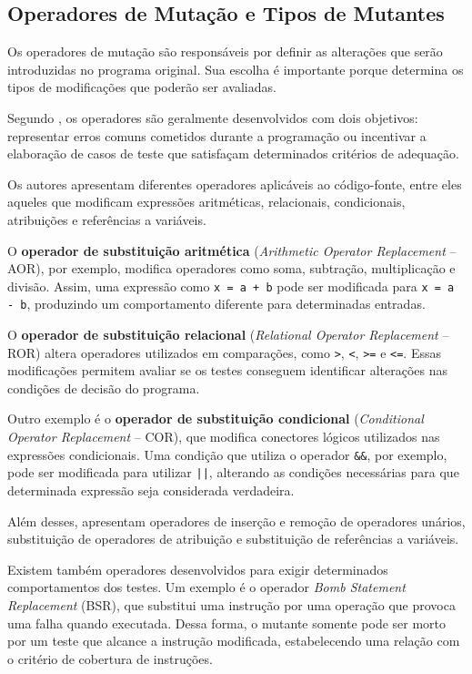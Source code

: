 \subsection{Operadores de Mutação e Tipos de Mutantes}

Os operadores de mutação são responsáveis por definir as alterações que serão introduzidas no programa original. Sua escolha é importante porque determina os tipos de modificações que poderão ser avaliadas.

Segundo , os operadores são geralmente desenvolvidos com dois objetivos: representar erros comuns cometidos durante a programação ou incentivar a elaboração de casos de teste que satisfaçam determinados critérios de adequação.

Os autores apresentam diferentes operadores aplicáveis ao código-fonte, entre eles aqueles que modificam expressões aritméticas, relacionais, condicionais, atribuições e referências a variáveis.

O \textbf{operador de substituição aritmética} (\textit{Arithmetic Operator Replacement} -- AOR), por exemplo, modifica operadores como soma, subtração, multiplicação e divisão. Assim, uma expressão como \texttt{x = a + b} pode ser modificada para \texttt{x = a - b}, produzindo um comportamento diferente para determinadas entradas.

O \textbf{operador de substituição relacional} (\textit{Relational Operator Replacement} -- ROR) altera operadores utilizados em comparações, como \texttt{>}, \texttt{<}, \texttt{>=} e \texttt{<=}. Essas modificações permitem avaliar se os testes conseguem identificar alterações nas condições de decisão do programa.

Outro exemplo é o \textbf{operador de substituição condicional} (\textit{Conditional Operator Replacement} -- COR), que modifica conectores lógicos utilizados nas expressões condicionais. Uma condição que utiliza o operador \texttt{\&\&}, por exemplo, pode ser modificada para utilizar \texttt{||}, alterando as condições necessárias para que determinada expressão seja considerada verdadeira.

Além desses,  apresentam operadores de inserção e remoção de operadores unários, substituição de operadores de atribuição e substituição de referências a variáveis.

Existem também operadores desenvolvidos para exigir determinados comportamentos dos testes. Um exemplo é o operador \textit{Bomb Statement Replacement} (BSR), que substitui uma instrução por uma operação que provoca uma falha quando executada. Dessa forma, o mutante somente pode ser morto por um teste que alcance a instrução modificada, estabelecendo uma relação com o critério de cobertura de instruções.

